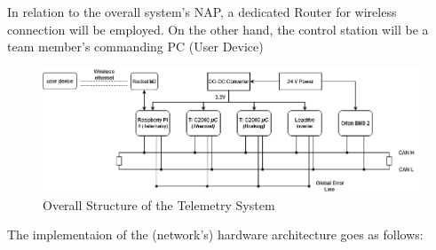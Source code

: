 \begin{enumerate}
In relation to the overall system's NAP, a dedicated Router for wireless connection will be employed. On the other hand, the control station will be a team member's commanding PC (User Device)
\begin{figure}[H]
    \centering
    \includegraphics[width=\textwidth]{texfiles/elec/eimg/telemetrysystems.png}
    \caption{Overall Structure of the Telemetry System}
    \label{fig:enter-label}
\end{figure}

The implementaion of the (network's) hardware architecture goes as follows: 



\end{enumerate}
